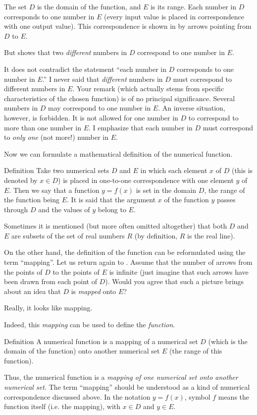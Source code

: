 {The set $D$ is the domain of the function, and $E$ is its range. Each number in $D$ corresponds to one number in $E$ (every input value is placed in correspondence with one output value). This correspondence is shown in  by arrows pointing from $D$ to $E$.


\rdr But  shows that two \emph{different} numbers in $D$ correspond to one number in $E$.

\athr It does not contradict the statement ``each number in $D$ corresponds to one number in $E$.'' I never said that \emph{different} numbers in $D$ must correspond to different numbers in $E$. Your remark (which actually stems from specific characteristics of the chosen function) is of no principal significance. Several numbers in $D$ may correspond to one number in $E$. An inverse situation, however, is forbidden. It is not allowed for one number in $D$ to correspond to more than one number in $E$. I emphasize that each number in $D$ must correspond to \emph{only one} (not more!) number in $E$.

Now we can formulate a mathematical definition of the numerical function.

\begin{mytheo}{Definition}
Take two numerical sets $D$ and $E$ in which each element $x$ of $D$ (this is denoted by $x \in D$) is placed in one-to-one correspondence with one element $y$ of $E$. Then we say that a function $y = f (x)$ is set in the domain $D$, the range of the function being $E$. It is said that the argument $x$ of the function $y$ passes through $D$ and the values of $y$ belong to $E$.
\end{mytheo}

Sometimes it is mentioned (but more often omitted altogether) that both $D$ and $E$ are subsets of the set of real numbers $R$ (by definition, $R$ is the real line).

On the other hand, the definition of the function can be reformulated using the term ``mapping''. Let us return again to . Assume that the number of arrows from the points of $D$ to the points of $E$ is infinite (just imagine that such arrows have been drawn from each point of $D$). Would you agree that such a picture brings about an idea that $D$ is \emph{mapped} onto $E$?

\rdr Really, it looks like mapping.

\athr Indeed, this \emph{mapping} can be used to define the \emph{function}.
\begin{mytheo}{Definition}
A numerical function is a mapping of a numerical set $D$ (which is the domain of the function) onto another numerical set $E$ (the range of this function).
\end{mytheo}
Thus, the numerical function is a \emph{mapping of one numerical set onto another numerical set.} The term ``mapping'' should be understood as a kind of numerical correspondence discussed above. In the notation $y = f (x)$, symbol $f$ means the function itself (i.e. the mapping), with $x \in D$ and $y \in E$.

}
